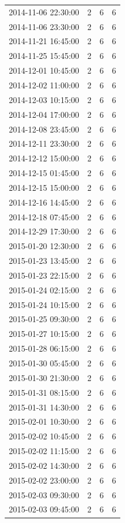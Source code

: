 \begin{tabular}{lrrr}
2014-11-06 22:30:00 & 2 & 6 & 6 \\
2014-11-06 23:30:00 & 2 & 6 & 6 \\
2014-11-21 16:45:00 & 2 & 6 & 6 \\
2014-11-25 15:45:00 & 2 & 6 & 6 \\
2014-12-01 10:45:00 & 2 & 6 & 6 \\
2014-12-02 11:00:00 & 2 & 6 & 6 \\
2014-12-03 10:15:00 & 2 & 6 & 6 \\
2014-12-04 17:00:00 & 2 & 6 & 6 \\
2014-12-08 23:45:00 & 2 & 6 & 6 \\
2014-12-11 23:30:00 & 2 & 6 & 6 \\
2014-12-12 15:00:00 & 2 & 6 & 6 \\
2014-12-15 01:45:00 & 2 & 6 & 6 \\
2014-12-15 15:00:00 & 2 & 6 & 6 \\
2014-12-16 14:45:00 & 2 & 6 & 6 \\
2014-12-18 07:45:00 & 2 & 6 & 6 \\
2014-12-29 17:30:00 & 2 & 6 & 6 \\
2015-01-20 12:30:00 & 2 & 6 & 6 \\
2015-01-23 13:45:00 & 2 & 6 & 6 \\
2015-01-23 22:15:00 & 2 & 6 & 6 \\
2015-01-24 02:15:00 & 2 & 6 & 6 \\
2015-01-24 10:15:00 & 2 & 6 & 6 \\
2015-01-25 09:30:00 & 2 & 6 & 6 \\
2015-01-27 10:15:00 & 2 & 6 & 6 \\
2015-01-28 06:15:00 & 2 & 6 & 6 \\
2015-01-30 05:45:00 & 2 & 6 & 6 \\
2015-01-30 21:30:00 & 2 & 6 & 6 \\
2015-01-31 08:15:00 & 2 & 6 & 6 \\
2015-01-31 14:30:00 & 2 & 6 & 6 \\
2015-02-01 10:30:00 & 2 & 6 & 6 \\
2015-02-02 10:45:00 & 2 & 6 & 6 \\
2015-02-02 11:15:00 & 2 & 6 & 6 \\
2015-02-02 14:30:00 & 2 & 6 & 6 \\
2015-02-02 23:00:00 & 2 & 6 & 6 \\
2015-02-03 09:30:00 & 2 & 6 & 6 \\
2015-02-03 09:45:00 & 2 & 6 & 6 \\

\end{tabular}

